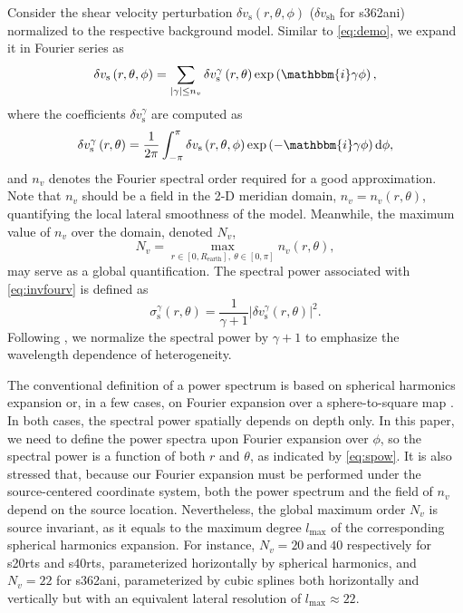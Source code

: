 \documentclass[extra,referee]{gji}
\begin{document}
Consider the shear velocity perturbation $\delta v_{\text{s}}\left(r,\theta,\phi\right)$ 
($\delta v_{\text{sh}}$ for s362ani) normalized to the respective background model.  
Similar to \eqref{eq:demo}, we expand it in Fourier series as
\begin{equation}
  \delta v_{\text{s}}\left(r,\theta,\phi\right)=\sum_{|\gamma| \le n_v} 
  \delta v_{\text{s}}^\gamma\left(r,\theta\right)\exp\left(\mathbbm{i}\gamma\phi\right),
  \label{eq:fourv}
\end{equation}
where the coefficients $\delta v_{\text{s}}^\gamma$ are computed as
\begin{equation}
  \delta v_{\text{s}}^\gamma\left(r,\theta\right) = \frac{1}{2\pi}\int_{-\pi}^{\pi}
  \delta v_{\text{s}}\left(r,\theta,\phi\right)\exp\left(-\mathbbm{i}\gamma\phi\right)
  \text{d}\phi,
  \label{eq:invfourv}
\end{equation}
and $n_v$ denotes the Fourier spectral order required for a good approximation. 
Note that $n_v$ should be a field in the 2-D meridian domain, 
$n_v=n_v\left(r,\theta\right)$,
quantifying the local lateral smoothness of the model. 
Meanwhile, the maximum value of $n_v$ over the domain, denoted $N_v$, 
\begin{equation}
  N_v=\max_{r\in[0,R_{\text{earth}}],\ \theta\in[0,\pi]}n_v\left(r,\theta\right),
\end{equation} 
may serve as a global quantification. 
The spectral power associated with \eqref{eq:invfourv} is defined as
\begin{equation}
  \sigma_{\text{s}}^\gamma\left(r,\theta\right)=\frac{1}{\gamma+1} 
  \left|\delta v_{\text{s}}^\gamma\left(r,\theta\right) \right|^2.
  \label{eq:spow}
\end{equation}
Following \cite{becker2002comparison}, we normalize the spectral power by 
$\gamma+1$ to emphasize the wavelength dependence of heterogeneity. 

The conventional definition of a power spectrum is based on 
spherical harmonics expansion
\cite[]{su1991predominance, becker2002comparison} 
or, in a few cases, on Fourier expansion over a sphere-to-square map
\cite[]{chevrot1998spectrum}. In both cases, the spectral power spatially 
depends on depth only. In this paper, we need to define the power spectra
upon Fourier expansion over $\phi$, so the spectral 
power is a function of both $r$ and $\theta$, as indicated by \eqref{eq:spow}. 
It is also stressed that, because our Fourier expansion must be performed under 
the source-centered coordinate system, both the power spectrum and the field
of $n_v$ depend on the source location. Nevertheless, the global maximum 
order $N_v$ is source invariant, as it equals to the maximum degree 
$l_\text{max}$ of the corresponding spherical harmonics expansion. 
For instance, $N_v=20\ \text{and}\ 40$ 
respectively for s20rts and s40rts, parameterized horizontally 
by spherical harmonics, and $N_v=22$ for s362ani, parameterized by cubic 
splines both horizontally and vertically but with an equivalent lateral 
resolution of $l_\text{max}\approx 22$.
\end{document}
